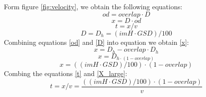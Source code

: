 Form figure \ref{fig:velocity}, we obtain the following equations:
\begin{equation}
od =overlap\cdot D
\label{od}
\end{equation}
\begin{equation}
x=D\cdot od
\label{x}
\end{equation}
\begin{equation}
t = x/v
\label{t}
\end{equation}
\begin{equation}
D=D_{h}=(imH\cdot GSD)/100
\label{D}
\end{equation}
Combining equations \ref{od} and \ref{D} into equation we obtain \ref{x}:
\begin{equation}
x = D_{h}-overlap\cdot D_{h}
\end{equation}
\begin{equation}
x= D_{h\cdot (1-overlap)}
\end{equation}
\begin{equation}
x = ((imH\cdot GSD)/100)\cdot (1-overlap)
\label{X_large}
\end{equation}
Combing the equations \ref{t} and \ref{X_large}:
\begin{equation}
t=x/v=\frac{((imH\cdot GSD)/100)\cdot (1-overlap)}{v}
\end{equation}
